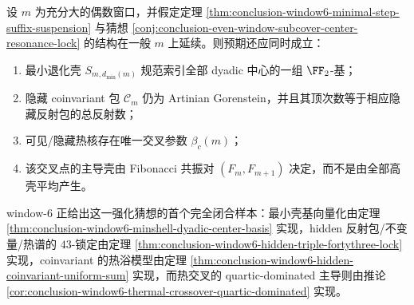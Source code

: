 \begin{conjecture}\label{conj:conclusion-even-window-subcover-coinvariant-thermal-lock}
设 \(m\) 为充分大的偶数窗口，并假定定理 \ref{thm:conclusion-window6-minimal-step-suffix-suspension} 与猜想 \ref{conj:conclusion-even-window-subcover-center-resonance-lock} 的结构在一般 \(m\) 上延续。则预期还应同时成立：
\begin{enumerate}
\item 最小退化壳 \(S_{m,d_{\min}(m)}\) 规范索引全部 dyadic 中心的一组 \(\FF_2\)-基；
\item 隐藏 coinvariant 包 \(\mathcal C_m\) 仍为 Artinian Gorenstein，并且其顶次数等于相应隐藏反射包的总反射数；
\item 可见/隐藏热核存在唯一交叉参数 \(\beta_c(m)\)；
\item 该交叉点的主导壳由 Fibonacci 共振对 \((F_m,F_{m+1})\) 决定，而不是由全部高壳平均产生。
\end{enumerate}
window-\(6\) 正给出这一强化猜想的首个完全闭合样本：最小壳基向量化由定理 \ref{thm:conclusion-window6-minshell-dyadic-center-basis} 实现，hidden 反射包/不变量/热谱的 \(43\)-锁定由定理 \ref{thm:conclusion-window6-hidden-triple-fortythree-lock} 实现，coinvariant 的热浴模型由定理 \ref{thm:conclusion-window6-hidden-coinvariant-uniform-sum} 实现，而热交叉的 quartic-dominated 主导则由推论 \ref{cor:conclusion-window6-thermal-crossover-quartic-dominated} 实现。
\end{conjecture}

